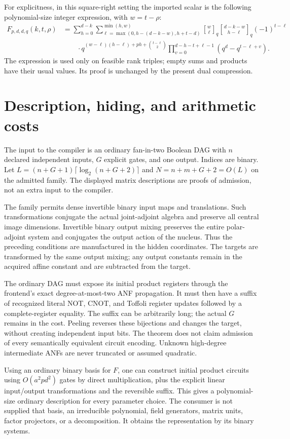 \documentclass[11pt]{article}
\begin{document}
For explicitness, in this square-right setting the imported scalar is
the following polynomial-size integer expression, with $w=t-\rho$:
\begin{align*}
 F_{p,d,d,q}(k,t,\rho)
 &=\sum_{h=0}^{d-k}
 \sum_{\ell=\max(0,h-(d-k-w),h+t-d)}^{\min(h,w)}
 {w\brack\ell}_q {d-k-w\brack h-\ell}_q (-1)^{t-\ell}\\
 &\qquad\cdot q^{(w-\ell)(h-\ell)+ph+\binom{t-\ell}{2}}
       \prod_{v=0}^{d-h-t+\ell-1}(q^d-q^{t-\ell+v}).
\end{align*}
The expression is used only on feasible rank triples; empty sums and
products have their usual values. Its proof is unchanged by the present
dual compression.

\section{Description, hiding, and arithmetic costs}\label{sec:syntax}

The input to the compiler is an ordinary fan-in-two Boolean DAG with
$n$ declared independent inputs, $G$ explicit gates, and one output.
Indices are binary. Let
$L=(n+G+1)\lceil\log_2(n+G+2)\rceil$ and $N=n+m+G+2=O(L)$
on the admitted family. The displayed matrix descriptions are proofs
of admission, not an extra input to the compiler.

The family permits dense invertible binary input maps and translations.
Such transformations conjugate the actual joint-adjoint algebra and
preserve all central image dimensions. Invertible binary output mixing
preserves the entire polar-adjoint system and conjugates the output
action of the nucleus. Thus the preceding conditions are manufactured
in the hidden coordinates. The targets are transformed by the same
output mixing; any output constants remain in the acquired affine
constant and are subtracted from the target.

The ordinary DAG must expose its initial product registers through the
frontend's exact degree-at-most-two ANF propagation. It must then have
a suffix of recognized literal NOT, CNOT, and Toffoli register updates
followed by a complete-register equality. The suffix can be arbitrarily
long; the actual $G$ remains in the cost. Peeling reverses these
bijections and changes the target, without creating independent input
bits. The theorem does not claim admission of every semantically
equivalent circuit encoding. Unknown high-degree intermediate ANFs
are never truncated or assumed quadratic.

Using an ordinary binary basis for $F$, one can construct initial product
circuits using $O(a^2pd^2)$ gates by direct multiplication, plus the
explicit linear input/output transformations and the reversible suffix.
This gives a polynomial-size ordinary description for every parameter
choice. The consumer is not supplied that basis, an irreducible
polynomial, field generators, matrix units, factor projectors, or a
decomposition. It obtains the representation by its binary systems.
\end{document}
